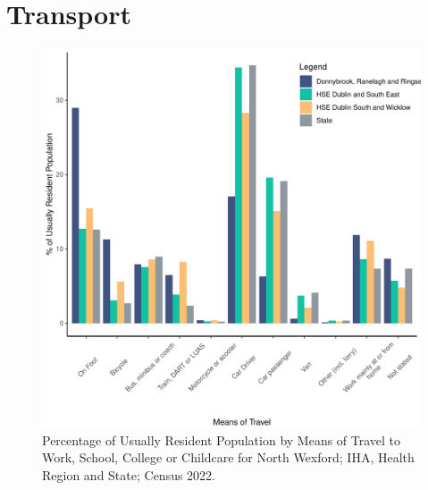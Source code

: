 \documentclass{article}
\begin{document}
\section{Transport}\label{sect:Trans}
\begin{figure}[H]
	\centering
	\includegraphics[width = 120mm]{../figures/TravelED.pdf}
	\caption{Percentage of Usually Resident Population by Means of Travel to Work, School, College or Childcare for North Wexford; IHA, Health Region and State; Census 2022.}
	\label{fig:vbnv}
	\end{figure}
\end{document}
